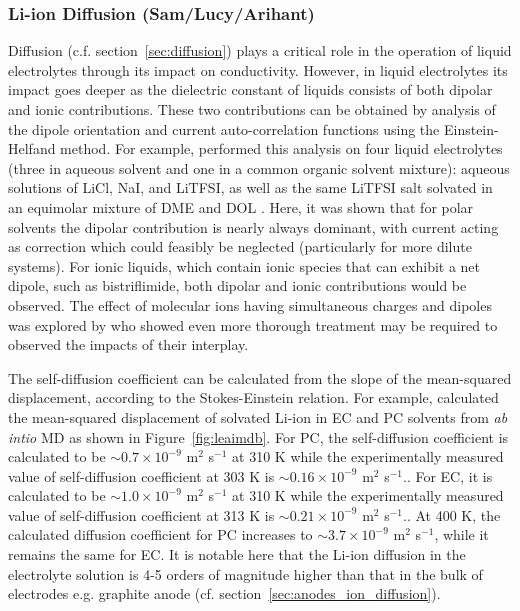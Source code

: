\documentclass[../main.tex]{subfiles}
\begin{document}
\subsubsection{Li-ion Diffusion (Sam/Lucy/Arihant)}
Diffusion (c.f. section~\ref{sec:diffusion}) plays a critical role in the operation of liquid electrolytes through its impact on conductivity. However, in liquid electrolytes its impact goes deeper as the dielectric constant of liquids consists of both dipolar and ionic contributions. These two contributions can be obtained by analysis of the dipole orientation and current auto-correlation functions using the Einstein-Helfand method. For example, \citeauthor{coles_correlation_2020} performed this analysis on four liquid electrolytes (three in aqueous solvent and one in a common organic solvent mixture): aqueous solutions of LiCl, NaI, and LiTFSI, as well as the same LiTFSI salt solvated in an equimolar mixture of DME and DOL \cite{coles_correlation_2020}. Here, it was shown that for polar solvents the dipolar contribution is nearly always dominant, with current acting as correction which could feasibly be neglected (particularly for more dilute systems). For ionic liquids, which contain ionic species that can exhibit a net dipole, such as bistriflimide, both dipolar and ionic contributions would be observed. The effect of molecular ions having simultaneous charges and dipoles was explored by \citeauthor{schroder_collective_2011} who showed even more thorough treatment may be required to observed the impacts of their interplay\cite{schroder_dielectric_2009}.

The self-diffusion coefficient can be calculated from the slope of the mean-squared displacement, according to the Stokes-Einstein relation. For example, \citeauthor{Ganesh2011} calculated the mean-squared displacement of solvated Li-ion in EC and PC solvents from \textit{ab intio} MD as shown in Figure~\ref{fig:leaimdb}. For PC, the self-diffusion coefficient is calculated to be $\sim0.7\times10^{-9}$ m$^2$ s$^{-1}$ at 310 K while the experimentally measured value of self-diffusion coefficient at 303 K is $\sim0.16\times10^{-9}$ m$^2$ s$^{-1}$.\cite{Hayamizu1999}. For EC, it is calculated to be $\sim1.0\times10^{-9}$ m$^2$ s$^{-1}$ at 310 K while the experimentally measured value of self-diffusion coefficient at 313 K is $\sim0.21\times10^{-9}$ m$^2$ s$^{-1}$.\cite{Hayamizu1999}. At 400 K, the calculated diffusion coefficient for PC increases to $\sim3.7\times10^{-9}$ m$^2$ s$^{-1}$, while it remains the same for EC. It is notable here that the Li-ion diffusion in the electrolyte solution is 4-5 orders of magnitude higher than that in the bulk of electrodes e.g. graphite anode (cf. section~\ref{sec:anodes_ion_diffusion}).
\end{document}
